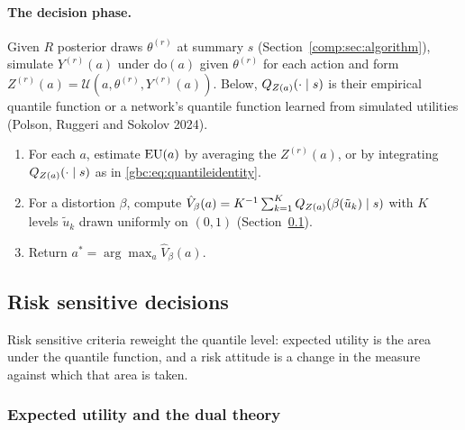 \paragraph{The decision phase.} Given $R$ posterior draws $\theta^{(r)}$ at summary $s$ (Section~\ref{comp:sec:algorithm}), simulate $Y^{(r)}(a)$ under $\mathrm{do}(a)$ given $\theta^{(r)}$ for each action and form $Z^{(r)}(a)=\mathcal{U}(a,\theta^{(r)},Y^{(r)}(a))$. Below, $Q_{Z(a)}(\cdot\mid s)$ is their empirical quantile function or a network's quantile function learned from simulated utilities (Polson, Ruggeri and Sokolov 2024).
\begin{enumerate}[leftmargin=*]
\item For each $a$, estimate $\mathrm{EU}(a)$ by averaging the $Z^{(r)}(a)$, or by integrating $Q_{Z(a)}(\cdot\mid s)$ as in \eqref{gbc:eq:quantileidentity}.
\item\label{gbc:step:distort} For a distortion $\beta$, compute $\hat V_\beta(a) = K^{-1}\sum_{k=1}^K Q_{Z(a)}(\beta(\tilde u_k)\mid s)$ with $K$ levels $\tilde u_k$ drawn uniformly on $(0,1)$ (Section~\ref{gbc:sec:risk}).
\item Return $a^\ast = \arg\max_a \hat V_\beta(a)$.
\end{enumerate}

\subsection{Risk sensitive decisions}\label{gbc:sec:risk}

Risk sensitive criteria reweight the quantile level: expected utility is the area under the quantile function, and a risk attitude is a change in the measure against which that area is taken.

\subsubsection{Expected utility and the dual theory}

